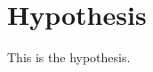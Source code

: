 \graphicspath{{main-matter/hypothesis/resources/}}

\chapter{Hypothesis}\label{chap_hypo}

This is the hypothesis.
